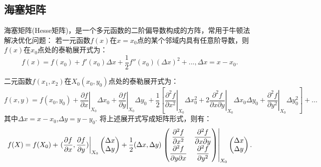 \subsection{海塞矩阵}
海塞矩阵(Hesse矩阵)，是一个多元函数的二阶偏导数构成的方阵，常用于牛顿法解决优化问题：
若一元函数$f(x)$在$x=x_0$点的某个邻域内具有任意阶导数，则$f(x)$在$x_0$点处的泰勒展开式为：
\begin{equation}
    f(x) = f(x_0) + f'(x_0)\Delta x + \frac{1}{2}f''(x_0)(\Delta x)^2 + ..., \Delta x = x - x_0 .
\end{equation}

二元函数$f(x_1,x_2)$在$X_0(x_0,y_0)$点处的泰勒展开式为：
\begin{equation}
    f(x,y) = f(x_0,y_0)
        + \left.\displaystyle\frac{\partial f}{\partial x}\right|_{X_0}\Delta x_0    
        + \left.\displaystyle\frac{\partial f}{\partial y}\right|_{X_0}\Delta y_0    
        + \frac{1}{2}
        \left[ \left.\displaystyle\frac{\partial^2f}{\partial x^2}\right|_{X_0}\Delta x_0^2 + 
            2\left.\displaystyle\frac{\partial^2f}{\partial x\partial y}\right|_{X_0}\Delta x_0\Delta y_0 + 
            \left.\displaystyle\frac{\partial^2f}{\partial y^2}\right|_{X_0}\Delta y_0^2 \right]   
        + ...
\end{equation}
其中$\Delta x = x - x_0$,$\Delta y = y - y_0$.
将上述展开式写成矩阵形式，则有：
\begin{equation}
    f(X) = f(X_0) 
    + \left.( \displaystyle\frac{\partial f}{\partial x},
        \displaystyle\frac{\partial f}{\partial y} )\right|_{X_0}    
        \begin{pmatrix}
                \Delta x \\
                \Delta y
        \end{pmatrix}
    +\newline \frac{1}{2}(\Delta x, \Delta y)
        \left.
        \begin{pmatrix}
            \displaystyle\frac{\partial^2f}{\partial x^2} & \displaystyle\frac{\partial^2f}{\partial x\partial y} \\
            \displaystyle\frac{\partial^2f}{\partial y\partial x} & \displaystyle\frac{\partial^2f}{\partial y^2}
        \end{pmatrix}
        \right|_{X_0}
        \begin{pmatrix}
                \Delta x \\
                \Delta y
        \end{pmatrix} .
\end{equation}
